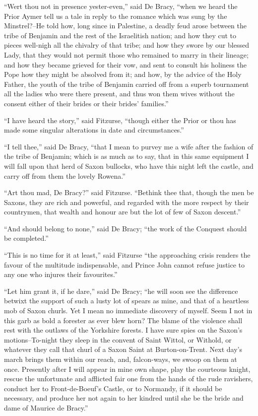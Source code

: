 ``Wert thou not in presence yester-even,'' said De Bracy, ``when we
heard the Prior Aymer tell us a tale in reply to the romance which was
sung by the Minstrel?--He told how, long since in Palestine, a deadly
feud arose between the tribe of Benjamin and the rest of the Israelitish
nation; and how they cut to pieces well-nigh all the chivalry of that
tribe; and how they swore by our blessed Lady, that they would not
permit those who remained to marry in their lineage; and how they became
grieved for their vow, and sent to consult his holiness the Pope how
they might be absolved from it; and how, by the advice of the Holy
Father, the youth of the tribe of Benjamin carried off from a superb
tournament all the ladies who were there present, and thus won them
wives without the consent either of their brides or their brides'
families.''

``I have heard the story,'' said Fitzurse, ``though either the Prior or
thou has made some singular alterations in date and circumstances.''

``I tell thee,'' said De Bracy, ``that I mean to purvey me a wife after
the fashion of the tribe of Benjamin; which is as much as to say, that
in this same equipment I will fall upon that herd of Saxon bullocks, who
have this night left the castle, and carry off from them the lovely
Rowena.''

``Art thou mad, De Bracy?'' said Fitzurse. ``Bethink thee that, though
the men be Saxons, they are rich and powerful, and regarded with the
more respect by their countrymen, that wealth and honour are but the lot
of few of Saxon descent.''

``And should belong to none,'' said De Bracy; ``the work of the Conquest
should be completed.''

``This is no time for it at least,'' said Fitzurse ``the approaching
crisis renders the favour of the multitude indispensable, and Prince
John cannot refuse justice to any one who injures their favourites.''

``Let him grant it, if he dare,'' said De Bracy; ``he will soon see the
difference betwixt the support of such a lusty lot of spears as mine,
and that of a heartless mob of Saxon churls. Yet I mean no immediate
discovery of myself. Seem I not in this garb as bold a forester as ever
blew horn? The blame of the violence shall rest with the outlaws of the
Yorkshire forests. I have sure spies on the Saxon's motions--To-night
they sleep in the convent of Saint Wittol, or Withold, or whatever they
call that churl of a Saxon Saint at Burton-on-Trent. Next day's march
brings them within our reach, and, falcon-ways, we swoop on them at
once. Presently after I will appear in mine own shape, play the
courteous knight, rescue the unfortunate and afflicted fair one from the
hands of the rude ravishers, conduct her to Front-de-Boeuf's Castle, or
to Normandy, if it should be necessary, and produce her not again to her
kindred until she be the bride and dame of Maurice de Bracy.''

